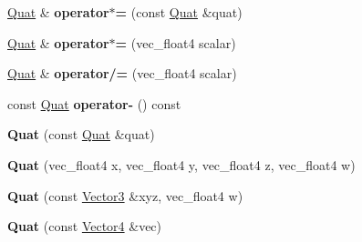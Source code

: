 \begin{DoxyCompactItemize}
\item 
\hypertarget{classVectormath_1_1Soa_1_1Quat_a54cd57e0e852f9e7830634b3bdb6f8d2}{\hyperlink{classVectormath_1_1Soa_1_1Quat}{Quat} \& {\bfseries operator$\ast$=} (const \hyperlink{classVectormath_1_1Soa_1_1Quat}{Quat} \&quat)}\label{classVectormath_1_1Soa_1_1Quat_a54cd57e0e852f9e7830634b3bdb6f8d2}

\item 
\hypertarget{classVectormath_1_1Soa_1_1Quat_afa3ff06388f941fb90025241a99687ef}{\hyperlink{classVectormath_1_1Soa_1_1Quat}{Quat} \& {\bfseries operator$\ast$=} (vec\-\_\-float4 scalar)}\label{classVectormath_1_1Soa_1_1Quat_afa3ff06388f941fb90025241a99687ef}

\item 
\hypertarget{classVectormath_1_1Soa_1_1Quat_af0502ee30517453d5205301faf4f0d72}{\hyperlink{classVectormath_1_1Soa_1_1Quat}{Quat} \& {\bfseries operator/=} (vec\-\_\-float4 scalar)}\label{classVectormath_1_1Soa_1_1Quat_af0502ee30517453d5205301faf4f0d72}

\item 
\hypertarget{classVectormath_1_1Soa_1_1Quat_aef664e62fe020e20626e95cb54bf6014}{const \hyperlink{classVectormath_1_1Soa_1_1Quat}{Quat} {\bfseries operator-\/} () const }\label{classVectormath_1_1Soa_1_1Quat_aef664e62fe020e20626e95cb54bf6014}

\item 
\hypertarget{classVectormath_1_1Soa_1_1Quat_a19610ca1d1e3f1ddf4914545a2124a14}{{\bfseries Quat} (const \hyperlink{classVectormath_1_1Soa_1_1Quat}{Quat} \&quat)}\label{classVectormath_1_1Soa_1_1Quat_a19610ca1d1e3f1ddf4914545a2124a14}

\item 
\hypertarget{classVectormath_1_1Soa_1_1Quat_ac9eef8cf0b8edc1f73b5620cebbc7ad4}{{\bfseries Quat} (vec\-\_\-float4 x, vec\-\_\-float4 y, vec\-\_\-float4 z, vec\-\_\-float4 w)}\label{classVectormath_1_1Soa_1_1Quat_ac9eef8cf0b8edc1f73b5620cebbc7ad4}

\item 
\hypertarget{classVectormath_1_1Soa_1_1Quat_ae8daa26c2467693d1198fc4042c9a0eb}{{\bfseries Quat} (const \hyperlink{classVectormath_1_1Soa_1_1Vector3}{Vector3} \&xyz, vec\-\_\-float4 w)}\label{classVectormath_1_1Soa_1_1Quat_ae8daa26c2467693d1198fc4042c9a0eb}

\item 
\hypertarget{classVectormath_1_1Soa_1_1Quat_afa066ea471328c39877f4fca5278f51c}{{\bfseries Quat} (const \hyperlink{classVectormath_1_1Soa_1_1Vector4}{Vector4} \&vec)}\label{classVectormath_1_1Soa_1_1Quat_afa066ea471328c39877f4fca5278f51c}


\end{DoxyCompactItemize}
